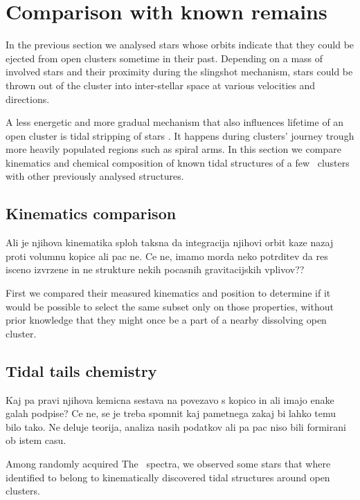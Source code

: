 \section{Comparison with known remains}
\label{sec:tails_chem}
In the previous section we analysed stars whose orbits indicate that they could be ejected from open clusters sometime in their past. Depending on a mass of involved stars and their proximity during the slingshot mechanism, stars could be thrown out of the cluster into inter-stellar space at various velocities and directions. 

A less energetic and more gradual mechanism that also influences lifetime of an open cluster is tidal stripping of stars \citep{2006A&A...455L..17L}. It happens during clusters' journey trough more heavily populated regions such as spiral arms. In this section we compare kinematics and chemical composition of known tidal structures \citep[discovered in \Gs\ data by ][]{2019AA...627A...4R, 2019AA...627A.119C, 2019AA...621L...3M, 2019arXiv191206657Z} of a few \Gh\ clusters with other previously analysed structures.

\subsection{Kinematics comparison}
Ali je njihova kinematika sploh taksna da integracija njihovi orbit kaze nazaj proti volumnu kopice ali pac ne. Ce ne, imamo morda neko potrditev da res isceno izvrzene in ne strukture nekih pocasnih gravitacijskih vplivov??

First we compared their measured kinematics and position to determine if it would be possible to select the same subset only on those properties, without prior knowledge that they might once be a part of a nearby dissolving open cluster. 

\subsection{Tidal tails chemistry}
Kaj pa pravi njihova kemicna sestava na povezavo s kopico in ali imajo enake galah podpise? Ce ne, se je treba spomnit kaj pametnega zakaj bi lahko temu bilo tako. Ne deluje teorija, analiza nasih podatkov ali pa pac niso bili formirani ob istem casu.

Among randomly acquired The \Gh\ spectra, we observed some stars that where identified to belong to kinematically discovered tidal structures around open clusters.


